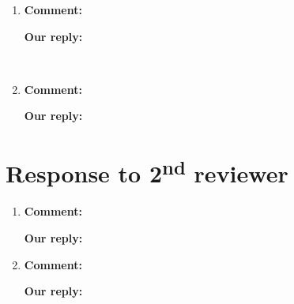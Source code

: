 \documentclass{article}
\newcommand\nd{\textsuperscript{nd}\xspace}
\begin{document}
\begin{enumerate}

\item \begin{flushleft}
    \textbf{Comment:}
  \end{flushleft}

  \begin{flushleft}
    \textbf{Our reply:}

\begin{itembox}[|]{}
\end{itembox}\\
  \end{flushleft}


\item \begin{flushleft}
    \textbf{Comment:}
  \end{flushleft}

  \begin{flushleft}
    \textbf{Our reply:}
  \end{flushleft}

\end{enumerate}

\section{Response to 2\nd reviewer}

\begin{enumerate}

\item \begin{flushleft}
    \textbf{Comment:}
  \end{flushleft}

  \begin{flushleft}
    \textbf{Our reply:}
  \end{flushleft}


\item \begin{flushleft}
    \textbf{Comment:}
  \end{flushleft}

  \begin{flushleft}
    \textbf{Our reply:}
  \end{flushleft}


\end{enumerate}
\end{document}
